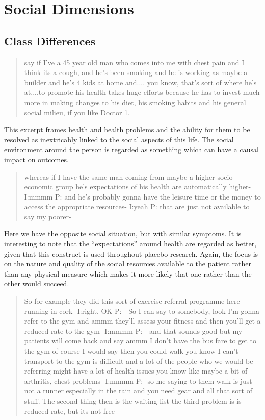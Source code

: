 \section{Social Dimensions}
\label{sec:social-dimensions}

\subsection{Class Differences}
\label{sec:class-differences}

\begin{quotation}
 say if I've a 45 year old man who comes into me with chest pain and I think its a cough, and he's been smoking and he is working as maybe a builder and he's 4 kids at home and.... you know, that's sort of where he's at....to promote his health takes huge efforts because he has to invest much more in making changes to his diet, his smoking habits and his general social milieu, if you like
Doctor 1.  
\end{quotation}

This excerpt frames health and health problems and the ability for them to be resolved as inextricably linked to the social aspects of this life. The social environment around the person is regarded as something which can have a causal impact on outcomes. 

\begin{quotation}
  whereas if I have the same man coming from maybe a higher socio-economic group he's expectations of his health are automatically higher-
I:mmmm
P: and he's probably gonna have the leisure time or the money to access the appropriate resources-
I:yeah
P: that are just not available to say my poorer-

\end{quotation}

Here we have the opposite social situation, but with similar symptoms. It is interesting to note that the ``expectations'' around health are regarded as better, given that this construct is used throughout placebo research. Again, the focus is on the nature and quality of the social resources available to the patient rather than any physical measure which makes it more likely that one rather than the other would succeed. 

\begin{quotation}
  So for example they did this sort of exercise referral programme here running in cork-
I:right, OK
P: - So I can say to somebody, look I'm gonna refer to the gym and ammm they'll assess your fitness  and then you'll get a reduced rate to the gym-
I:mmmm
P: - and that sounds good but my patients will come back and say ammm I don't have the bus fare to get to the gym of course I would say then you could walk you know I can't transport to the gym is difficult and a lot of the people who we would be referring might have a lot of health issues you know like maybe a bit of arthritis, chest problems-
I:mmmm
P:- so me saying to them walk is just not a runner especially in the rain and you need gear and all that sort of stuff. The second thing then is the waiting list the third problem is is reduced rate, but its not free-
\end{quotation}

